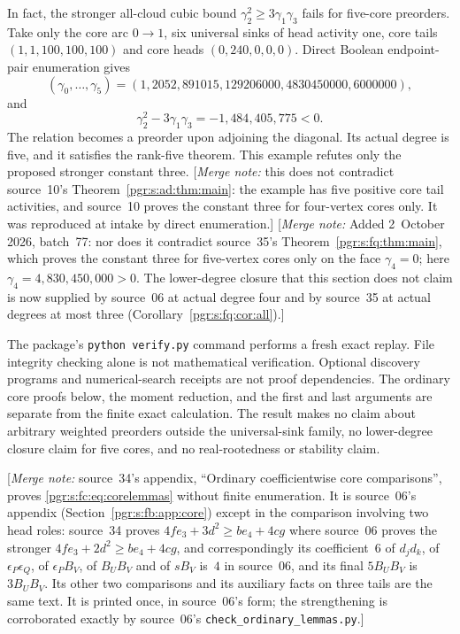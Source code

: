 \documentclass[11pt]{article}
\numberwithin{equation}{section}
\theoremstyle{definition}\newtheorem{definition}[theorem]{Definition}\newtheorem{remark}[theorem]{Remark}
\newcommand{\mnote}[1]{[\textit{Merge note:} #1]}
\begin{document}
In fact, the stronger all-cloud cubic bound $\gamma_2^2\ge3\gamma_1\gamma_3$ fails for five-core preorders. Take only the core arc $0\to1$, six universal sinks of head activity one, core tails $(1,1,100,100,100)$ and core heads $(0,240,0,0,0)$. Direct Boolean endpoint-pair enumeration gives
\[
 (\gamma_0,\ldots,\gamma_5)
 =(1,2052,891015,129206000,4830450000,6000000),
\]
and
\[
 \gamma_2^2-3\gamma_1\gamma_3=-1,484,405,775<0.
\]
The relation becomes a preorder upon adjoining the diagonal. Its actual degree is five, and it satisfies the rank-five theorem. This example refutes only the proposed stronger constant three.
\mnote{this does not contradict source~10's Theorem~\ref{pgr:s:ad:thm:main}:
the example has five positive core tail activities, and source~10 proves
the constant three for four-vertex cores only. It was reproduced at intake
by direct enumeration.}
\mnote{Added 2~October 2026, batch~77: nor does it contradict source~35's
Theorem~\ref{pgr:s:fq:thm:main}, which proves the constant three for
five-vertex cores only on the face $\gamma_4=0$; here
$\gamma_4=4{,}830{,}450{,}000>0$. The lower-degree closure that this
section does not claim is now supplied by source~06 at actual degree four
and by source~35 at actual degrees at most three
(Corollary~\ref{pgr:s:fq:cor:all}).}


The package's \texttt{python verify.py} command performs a fresh exact replay. File integrity checking alone is not mathematical verification. Optional discovery programs and numerical-search receipts are not proof dependencies. The ordinary core proofs below, the moment reduction, and the first and last arguments are separate from the finite exact calculation. The result makes no claim about arbitrary weighted preorders outside the universal-sink family, no lower-degree closure claim for five cores, and no real-rootedness or stability claim.


\mnote{source~34's appendix, ``Ordinary coefficientwise core comparisons'',
proves \eqref{pgr:s:fc:eq:corelemmas} without finite enumeration. It is
source~06's appendix (Section~\ref{pgr:s:fb:app:core}) except in the
comparison involving two head roles: source~34 proves
$4fe_3+3d^2\ge be_4+4cg$ where source~06 proves the stronger
$4fe_3+2d^2\ge be_4+4cg$, and correspondingly its coefficient~$6$ of
$d_jd_k$, of $\epsilon_P\epsilon_Q$, of $\epsilon_PB_V$, of $B_UB_V$ and of
$sB_V$ is~$4$ in source~06, and its final $5B_UB_V$ is $3B_UB_V$. Its
other two comparisons and its auxiliary facts on three tails are the same
text. It is printed once, in source~06's form; the strengthening is
corroborated exactly by source~06's \texttt{check\_ordinary\_lemmas.py}.}
\end{document}
